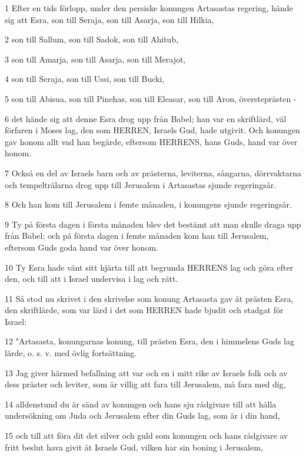 \par 1 Efter en tids förlopp, under den persiske konungen Artasastas regering, hände sig att Esra, son till Seraja, son till Asarja, son till Hilkia,
\par 2 son till Sallum, son till Sadok, son till Ahitub,
\par 3 son till Amarja, son till Asarja, son till Merajot,
\par 4 son till Seraja, son till Ussi, son till Bucki,
\par 5 son till Abisua, son till Pinehas, son till Eleasar, son till Aron, översteprästen -
\par 6 det hände sig att denne Esra drog upp från Babel; han var en skriftlärd, väl förfaren i Moses lag, den som HERREN, Israels Gud, hade utgivit. Och konungen gav honom allt vad han begärde, eftersom HERRENS, hans Guds, hand var över honom.
\par 7 Också en del av Israels barn och av prästerna, leviterna, sångarna, dörrvaktarna och tempelträlarna drog upp till Jerusalem i Artasastas sjunde regeringsår.
\par 8 Och han kom till Jerusalem i femte månaden, i konungens sjunde regeringsår.
\par 9 Ty på första dagen i första månaden blev det bestämt att man skulle draga upp från Babel; och på första dagen i femte månaden kom han till Jerusalem, eftersom Guds goda hand var över honom.
\par 10 Ty Esra hade vänt sitt hjärta till att begrunda HERRENS lag och göra efter den, och till att i Israel undervisa i lag och rätt.
\par 11 Så stod nu skrivet i den skrivelse som konung Artasasta gav åt prästen Esra, den skriftlärde, som var lärd i det som HERREN hade bjudit och stadgat för Israel:
\par 12 "Artasasta, konungarnas konung, till prästen Esra, den i himmelens Guds lag lärde, o. s. v. med övlig fortsättning.
\par 13 Jag giver härmed befallning att var och en i mitt rike av Israels folk och av dess präster och leviter, som är villig att fara till Jerusalem, må fara med dig,
\par 14 alldenstund du är sänd av konungen och hans sju rådgivare till att hålla undersökning om Juda och Jerusalem efter din Guds lag, som är i din hand,
\par 15 och till att föra dit det silver och guld som konungen och hans rådgivare av fritt beslut hava givit åt Israels Gud, vilken har sin boning i Jerusalem,
